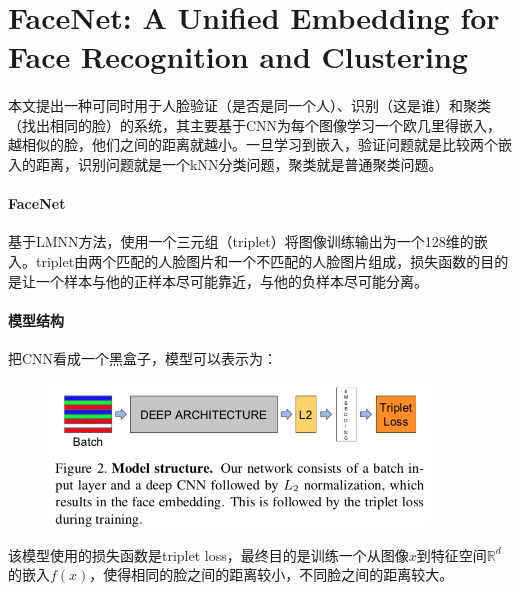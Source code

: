 \documentclass[10pt,letterpaper]{article}
\begin{document}
\newpage
\section{FaceNet: A Unified Embedding for Face Recognition and Clustering\cite{facenet}}
\paragraph{} 本文提出一种可同时用于人脸验证（是否是同一个人）、识别（这是谁）和聚类（找出相同的脸）的系统，其主要基于CNN为每个图像学习一个欧几里得嵌入，越相似的脸，他们之间的距离就越小。一旦学习到嵌入，验证问题就是比较两个嵌入的距离，识别问题就是一个kNN分类问题，聚类就是普通聚类问题。
\paragraph{FaceNet} 基于LMNN方法，使用一个三元组（triplet）将图像训练输出为一个128维的嵌入。triplet由两个匹配的人脸图片和一个不匹配的人脸图片组成，损失函数的目的是让一个样本与他的正样本尽可能靠近，与他的负样本尽可能分离。

\paragraph{模型结构} 把CNN看成一个黑盒子，模型可以表示为：
\begin{figure}[H]
	\centering
	\includegraphics[width=0.9\textwidth]{../images/facenet-model.png}
	\caption{}
	\label{FaceNet Model}
\end{figure}
该模型使用的损失函数是triplet loss，最终目的是训练一个从图像$x$到特征空间$\mathbb{R}^d$的嵌入$f(x)$，使得相同的脸之间的距离较小，不同脸之间的距离较大。
\end{document}
